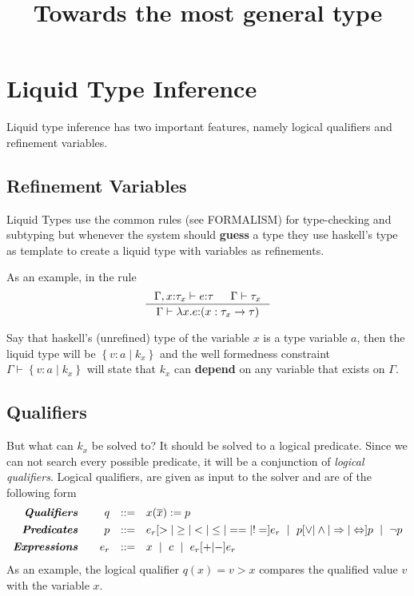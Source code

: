 \documentclass[10pt,a4paper]{article}
\title{Towards the most general type}
\newcommand\hastype[3]{\ensuremath{#1 \vdash #2 \colon #3}}
\newcommand\iswellformed[2]{\ensuremath{#1 \vdash #2}}
\begin{document}
\section*{Liquid Type Inference}
Liquid type inference has two important features, 
namely logical qualifiers and refinement variables.

\subsection*{Refinement Variables}
Liquid Types use the common rules (see FORMALISM) for type-checking and subtyping 
but whenever the system should \textbf{guess} a type
they use haskell's type as template to create a liquid type with 
variables as refinements.

As an example, in the rule
$$
\inference{
	\hastype{\Gamma, x\colon\tau_x}{e}{\tau} &&
	\iswellformed{\Gamma}{\tau_x}
}{
	\hastype{\Gamma}{\lambda x . e}{(x:\tau_x \rightarrow \tau)}
}
$$

Say that haskell's (unrefined) type of the variable $x$
is a type variable $a$, 
then the liquid type will be 
$\left\lbrace v\colon a \mid k_x \right\rbrace$
and the well formedness constraint
$\iswellformed{\Gamma}{\left\lbrace v\colon a \mid k_x \right\rbrace}$
will state that $k_x$ can \textbf{depend} on any variable that exists on $\Gamma$.


\subsection*{Qualifiers}
But what can $k_x$ be solved to?
It should be solved to a logical predicate.
Since we can not search every possible predicate, 
it will be a conjunction of \textit{logical qualifiers}.
%
Logical qualifiers,  
are given as input to the solver and are of the following form
%
$$
\begin{array}{rrcl}
\emphbf{Qualifiers} \quad 
  & q
  & ::= 
  &    x(\overline{x}) := p   
  \\[0.05in] 

\emphbf{Predicates} \quad 
  & p 
  & ::= 
  &      e_r [> | \geq | < | \leq | == | !=] e_r
  \spmid  p [\lor | \land | \Rightarrow | \Leftrightarrow ] p 
  \spmid \lnot p
  \\[0.05in] 

\emphbf{Expressions} \quad 
  & e_r
  & ::= 
  &    x \spmid c  \spmid  e_r [+ | -] e_r   
\end{array}
$$
%
As an example, the logical qualifier 
$q(x) = v > x$
compares the qualified value $v$ with the variable $x$.
\end{document}
